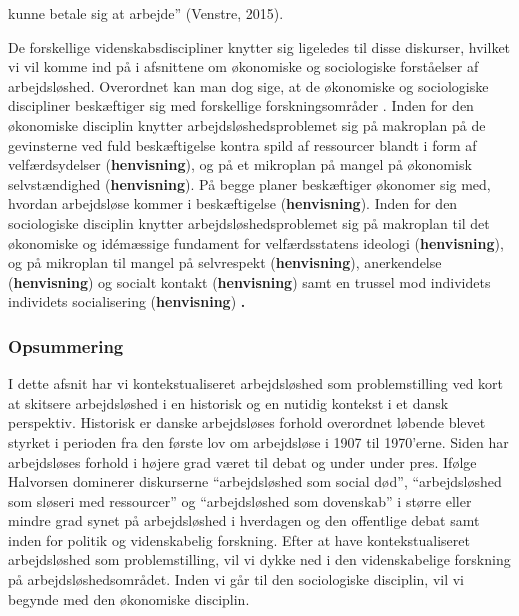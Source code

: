 kunne betale sig at arbejde” (Venstre, 2015).

De forskellige videnskabsdiscipliner knytter sig ligeledes til disse diskurser, hvilket vi vil komme ind på i afsnittene om økonomiske og sociologiske forståelser af arbejdsløshed. Overordnet kan man dog sige, at de økonomiske og sociologiske discipliner beskæftiger sig med forskellige forskningsområder \textbf{\parencite[10-11]{Halvorsen1999}}. Inden for den økonomiske disciplin knytter arbejdsløshedsproblemet sig på makroplan på de gevinsterne ved fuld beskæftigelse kontra spild af ressourcer blandt i form af velfærdsydelser (\textbf{henvisning}), og på et mikroplan på mangel på økonomisk selvstændighed (\textbf{henvisning}). På begge planer beskæftiger økonomer sig med, hvordan arbejdsløse kommer i beskæftigelse (\textbf{henvisning}). Inden for den sociologiske disciplin knytter arbejdsløshedsproblemet sig på makroplan til det økonomiske og idémæssige fundament for velfærdsstatens ideologi (\textbf{henvisning}), og på mikroplan til mangel på selvrespekt (\textbf{henvisning}), anerkendelse (\textbf{henvisning}) og socialt kontakt (\textbf{henvisning}) samt en trussel mod individets individets socialisering (\textbf{henvisning}) \textbf{\parencite[10-11]{Halvorsen1999}.}  %


\subsubsection{Opsummering}

I dette afsnit har vi kontekstualiseret arbejdsløshed som problemstilling ved kort at skitsere arbejdsløshed i en historisk og en nutidig kontekst i et dansk perspektiv. Historisk er danske arbejdsløses forhold overordnet løbende blevet styrket i perioden fra den første lov om arbejdsløse i 1907 til 1970'erne. Siden har arbejdsløses forhold i højere grad været til debat og under under pres. Ifølge Halvorsen dominerer diskurserne “arbejdsløshed som social død”, “arbejdsløshed som sløseri med ressourcer” og “arbejdsløshed som dovenskab” i større eller mindre grad synet på arbejdsløshed i hverdagen og den offentlige debat samt inden for politik og videnskabelig forskning. Efter at have kontekstualiseret arbejdsløshed som problemstilling, vil vi dykke ned i den videnskabelige forskning på arbejdsløshedsområdet. Inden vi går til den sociologiske disciplin, vil vi begynde med den økonomiske disciplin.






